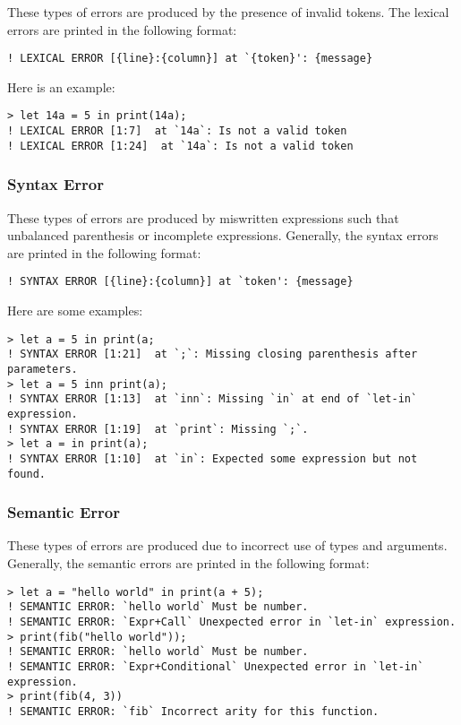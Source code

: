 \documentclass[a4paper, 12pt]{report}
\begin{document}
These types of errors are produced by the presence of invalid tokens. The lexical errors 
are printed in the following format:

\begin{lstlisting}
! LEXICAL ERROR [{line}:{column}] at `{token}': {message}
\end{lstlisting}

Here is an example:

\begin{lstlisting}
> let 14a = 5 in print(14a);
! LEXICAL ERROR [1:7]  at `14a`: Is not a valid token
! LEXICAL ERROR [1:24]  at `14a`: Is not a valid token
\end{lstlisting}

\subsubsection*{Syntax Error}

These types of errors are produced by miswritten expressions such that unbalanced parenthesis
or incomplete expressions. Generally, the syntax errors are printed in the following format:

\begin{lstlisting}
! SYNTAX ERROR [{line}:{column}] at `token': {message}
\end{lstlisting}

Here are some examples:

\begin{lstlisting}
> let a = 5 in print(a;
! SYNTAX ERROR [1:21]  at `;`: Missing closing parenthesis after parameters.
> let a = 5 inn print(a);
! SYNTAX ERROR [1:13]  at `inn`: Missing `in` at end of `let-in` expression.
! SYNTAX ERROR [1:19]  at `print`: Missing `;`.
> let a = in print(a);
! SYNTAX ERROR [1:10]  at `in`: Expected some expression but not found.
\end{lstlisting}

\subsubsection*{Semantic Error}

These types of errors are produced due to incorrect use of types and arguments. Generally, the
semantic errors are printed in the following format:

\begin{lstlisting}
> let a = "hello world" in print(a + 5);
! SEMANTIC ERROR: `hello world` Must be number.
! SEMANTIC ERROR: `Expr+Call` Unexpected error in `let-in` expression.
> print(fib("hello world"));
! SEMANTIC ERROR: `hello world` Must be number.
! SEMANTIC ERROR: `Expr+Conditional` Unexpected error in `let-in` expression.
> print(fib(4, 3))
! SEMANTIC ERROR: `fib` Incorrect arity for this function.
\end{lstlisting}
\end{document}
